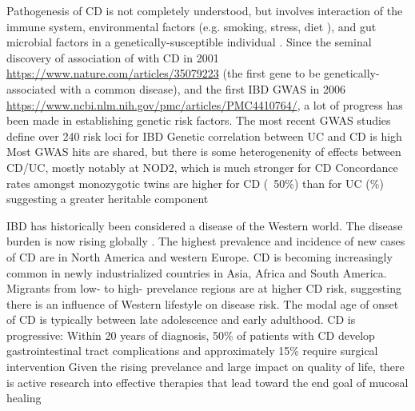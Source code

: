 \begin{outline}
\1 Pathogenesis of CD is not completely understood, but involves interaction of the immune system, environmental factors (e.g. smoking, stress, diet \autocite{ananthakrishnan2015EpidemiologyRiskFactors,roda2020CrohnDisease}), and gut microbial factors in a genetically-susceptible individual \autocite{desouza2016ImmunopathogenesisIBDCurrent}.
    \2 Since the seminal discovery of association of  with CD in 2001 \url{https://www.nature.com/articles/35079223} (the first gene to be genetically-associated with a common disease), and the first IBD GWAS in 2006 \url{https://www.ncbi.nlm.nih.gov/pmc/articles/PMC4410764/}, a lot of progress has been made in establishing genetic risk factors.
    \2 The most recent GWAS studies define over 240 risk loci for IBD \autocite{delange2017GenomewideAssociationStudy}
    \2 Genetic correlation between UC and CD is high \autocite{cotsapas2013ImmunemediatedDiseaseGenetics,david2018GeneticsImmunemediatedInflammatory}
    \2 Most GWAS hits are shared, but there is some heterogenenity of effects between CD/UC, mostly notably at NOD2, which is much stronger for CD \autocite{jostins2012HostMicrobeInteractions,liu2015AssociationAnalysesIdentify}
    \2 Concordance rates amongst monozygotic twins are higher for CD (~50\%) than for UC (\%) suggesting a greater heritable component \autocite{roda2020CrohnDisease}

\1 IBD has historically been considered a disease of the Western world.
    \2 The disease burden is now rising globally \autocite{kaplan2015GlobalBurdenIBD,alatab2020GlobalRegionalNational}.
    \2 The highest prevalence and incidence of new cases of CD are in North America and western Europe. \autocite{roda2020CrohnDisease}
    \2 CD is becoming increasingly common in newly industrialized countries in Asia, Africa and South America.
        \3 Migrants from low- to high- prevelance regions are at higher CD risk, suggesting there is an influence of Western lifestyle on disease risk. \autocite{roda2020CrohnDisease}
    \2 The modal age of onset of CD is typically between late adolescence and early adulthood.
    \2 CD is progressive: Within 20 years of diagnosis, 50\% of patients with CD develop gastrointestinal tract complications and approximately 15\% require surgical intervention \autocite{roda2020CrohnDisease}
    \2 Given the rising prevelance and large impact on quality of life, there is active research into effective therapies that lead toward the end goal of mucosal healing \autocite{roda2020CrohnDisease} 


\end{outline}
